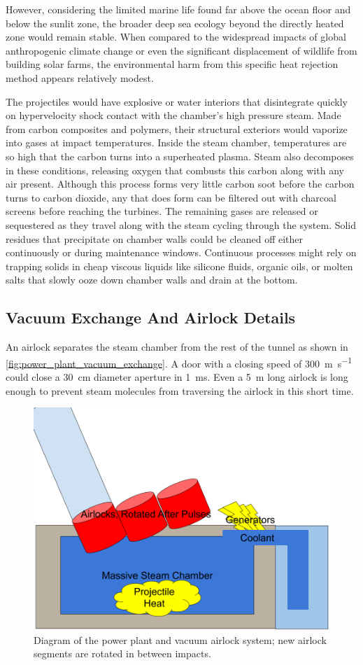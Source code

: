 \documentclass{article}
\begin{document}
However, considering the limited marine life found far above the ocean floor and below the sunlit zone, the broader deep sea ecology beyond the directly heated zone would remain stable. When compared to the widespread impacts of global anthropogenic climate change or even the significant displacement of wildlife from building solar farms, the environmental harm from this specific heat rejection method appears relatively modest.

The projectiles would have explosive or water interiors that disintegrate quickly on hypervelocity shock contact with the chamber's high pressure steam. Made from carbon composites and polymers, their structural exteriors would vaporize into gases at impact temperatures. Inside the steam chamber, temperatures are so high that the carbon turns into a superheated plasma. Steam also decomposes in these conditions, releasing oxygen that combusts this carbon along with any air present. Although this process forms very little carbon soot before the carbon turns to carbon dioxide, any that does form can be filtered out with charcoal screens before reaching the turbines.   The remaining gases are released or sequestered as they travel along with the steam cycling through the system.   Solid residues that precipitate on chamber walls could be cleaned off either continuously or during maintenance windows.  Continuous processes might rely on trapping solids in cheap viscous liquids like silicone fluids, organic oils, or molten salts that slowly ooze down chamber walls and drain at the bottom.  

\subsection{Vacuum Exchange And Airlock Details}\label{sec:vacuum_airlock}
An airlock separates the steam chamber from the rest of the tunnel as shown in \autoref{fig:power_plant_vacuum_exchange}.   A door with a closing speed of \SI{300}{\meter\per\second} could close a \SI{30}{\centi\meter} diameter aperture in \SI{1}{\milli\second}.  Even a \SI{5}{\meter} long airlock is long enough to prevent steam molecules from traversing the airlock in this short time.  

\begin{figure}[htpb]
    \centering
    \includegraphics[width=0.5\linewidth]{images/Power Plant Cooling and Generators.png}
    \caption{Diagram of the power plant and vacuum airlock system; new airlock segments are rotated in between impacts.}
    \label{fig:power_plant_vacuum_exchange}
\end{figure}
\end{document}
